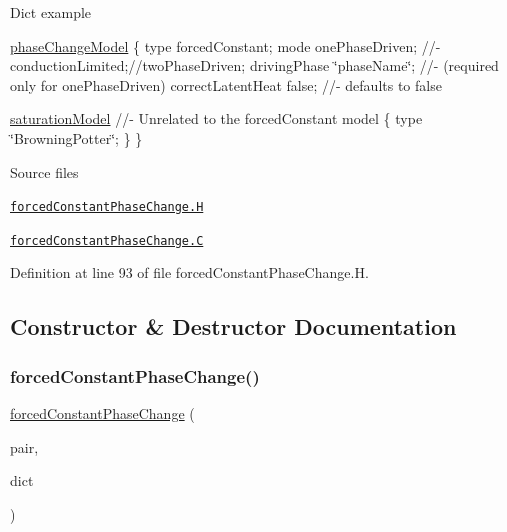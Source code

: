 Dict example

\hyperlink{classFoam_1_1phaseChangeModel}{phase\+Change\+Model} \{ type forced\+Constant; mode one\+Phase\+Driven; //-\/ conduction\+Limited;//two\+Phase\+Driven; driving\+Phase \char`\"{}phase\+Name\char`\"{}; //-\/ (required only for one\+Phase\+Driven) correct\+Latent\+Heat false; //-\/ defaults to false

\hyperlink{classFoam_1_1saturationModel}{saturation\+Model} //-\/ Unrelated to the forced\+Constant model \{ type \char`\"{}\+Browning\+Potter\char`\"{}; \} \}

\begin{DoxyParagraph}{Source files}

\begin{DoxyItemize}
\item \href{../../../home/carlo/data/GeN-Foam/GeN-Foam_ffn/GeN-Foam/GeN-Foam/classes/thermalHydraulics/src/physicsModels/phaseChangeModels/forcedConstant/forcedConstantPhaseChange.H}{\tt forced\+Constant\+Phase\+Change.\+H} 
\item \href{../../../home/carlo/data/GeN-Foam/GeN-Foam_ffn/GeN-Foam/GeN-Foam/classes/thermalHydraulics/src/physicsModels/phaseChangeModels/forcedConstant/forcedConstantPhaseChange.C}{\tt forced\+Constant\+Phase\+Change.\+C} 
\end{DoxyItemize}
\end{DoxyParagraph}


Definition at line 93 of file forced\+Constant\+Phase\+Change.\+H.



\subsection{Constructor \& Destructor Documentation}
\mbox{\label{classFoam_1_1phaseChangeModels_1_1forcedConstantPhaseChange_abf5a9f61afee679e24f54d9ebd565f05}} 
\subsubsection{\texorpdfstring{forced\+Constant\+Phase\+Change()}{forcedConstantPhaseChange()}}
{\footnotesize\ttfamily \hyperlink{classFoam_1_1phaseChangeModels_1_1forcedConstantPhaseChange}{forced\+Constant\+Phase\+Change} (\begin{DoxyParamCaption}\item[{\hyperlink{classFoam_1_1FFPair}{F\+F\+Pair} \&}]{pair,  }\item[{const dictionary \&}]{dict }\end{DoxyParamCaption})}



